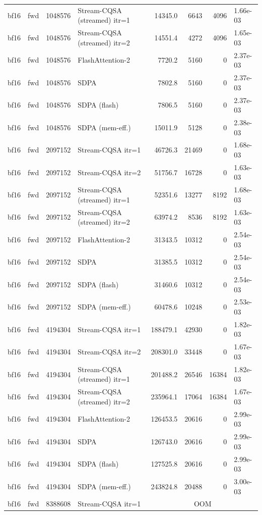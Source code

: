 \begin{tabular}{llrlrrrl}
bf16 & fwd & 1048576 & Stream-CQSA (streamed) itr=1 & 14345.0 & 6643 & 4096 & 1.66e-03 \\
bf16 & fwd & 1048576 & Stream-CQSA (streamed) itr=2 & 14551.4 & 4272 & 4096 & 1.65e-03 \\
bf16 & fwd & 1048576 & FlashAttention-2 & 7720.2 & 5160 & 0 & 2.37e-03 \\
bf16 & fwd & 1048576 & SDPA & 7802.8 & 5160 & 0 & 2.37e-03 \\
bf16 & fwd & 1048576 & SDPA (flash) & 7806.5 & 5160 & 0 & 2.37e-03 \\
bf16 & fwd & 1048576 & SDPA (mem-eff.) & 15011.9 & 5128 & 0 & 2.38e-03 \\
bf16 & fwd & 2097152 & Stream-CQSA itr=1 & 46726.3 & 21469 & 0 & 1.68e-03 \\
bf16 & fwd & 2097152 & Stream-CQSA itr=2 & 51756.7 & 16728 & 0 & 1.63e-03 \\
bf16 & fwd & 2097152 & Stream-CQSA (streamed) itr=1 & 52351.6 & 13277 & 8192 & 1.68e-03 \\
bf16 & fwd & 2097152 & Stream-CQSA (streamed) itr=2 & 63974.2 & 8536 & 8192 & 1.63e-03 \\
bf16 & fwd & 2097152 & FlashAttention-2 & 31343.5 & 10312 & 0 & 2.54e-03 \\
bf16 & fwd & 2097152 & SDPA & 31385.5 & 10312 & 0 & 2.54e-03 \\
bf16 & fwd & 2097152 & SDPA (flash) & 31460.6 & 10312 & 0 & 2.54e-03 \\
bf16 & fwd & 2097152 & SDPA (mem-eff.) & 60478.6 & 10248 & 0 & 2.53e-03 \\
bf16 & fwd & 4194304 & Stream-CQSA itr=1 & 188479.1 & 42930 & 0 & 1.82e-03 \\
bf16 & fwd & 4194304 & Stream-CQSA itr=2 & 208301.0 & 33448 & 0 & 1.67e-03 \\
bf16 & fwd & 4194304 & Stream-CQSA (streamed) itr=1 & 201488.2 & 26546 & 16384 & 1.82e-03 \\
bf16 & fwd & 4194304 & Stream-CQSA (streamed) itr=2 & 235964.1 & 17064 & 16384 & 1.67e-03 \\
bf16 & fwd & 4194304 & FlashAttention-2 & 126453.5 & 20616 & 0 & 2.99e-03 \\
bf16 & fwd & 4194304 & SDPA & 126743.0 & 20616 & 0 & 2.99e-03 \\
bf16 & fwd & 4194304 & SDPA (flash) & 127525.8 & 20616 & 0 & 2.99e-03 \\
bf16 & fwd & 4194304 & SDPA (mem-eff.) & 243824.8 & 20488 & 0 & 3.00e-03 \\
bf16 & fwd & 8388608 & Stream-CQSA itr=1 & \multicolumn{4}{c}{OOM} \\

\end{tabular}
